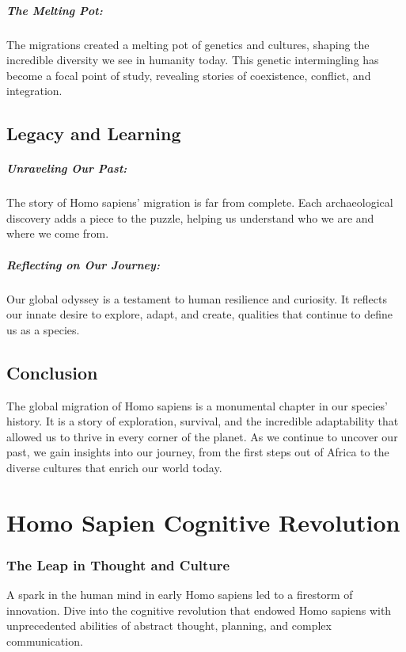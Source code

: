 \documentclass[a4paper,12pt]{book}
\begin{document}
\paragraph{The Melting Pot:}
The migrations created a melting pot of genetics and cultures, shaping the incredible diversity we see in humanity today. This genetic intermingling has become a focal point of study, revealing stories of coexistence, conflict, and integration.

\section*{Legacy and Learning}

\paragraph{Unraveling Our Past:}
The story of Homo sapiens’ migration is far from complete. Each archaeological discovery adds a piece to the puzzle, helping us understand who we are and where we come from.

\paragraph{Reflecting on Our Journey:}
Our global odyssey is a testament to human resilience and curiosity. It reflects our innate desire to explore, adapt, and create, qualities that continue to define us as a species.

\section*{Conclusion}

The global migration of Homo sapiens is a monumental chapter in our species’ history. It is a story of exploration, survival, and the incredible adaptability that allowed us to thrive in every corner of the planet. As we continue to uncover our past, we gain insights into our journey, from the first steps out of Africa to the diverse cultures that enrich our world today.

\chapter{Homo Sapien Cognitive Revolution}
\subsection*{The Leap in Thought and Culture}
A spark in the human mind in early Homo sapiens led to a firestorm of innovation. Dive into the cognitive revolution that endowed Homo sapiens with unprecedented abilities of abstract thought, planning, and complex communication.
\end{document}
